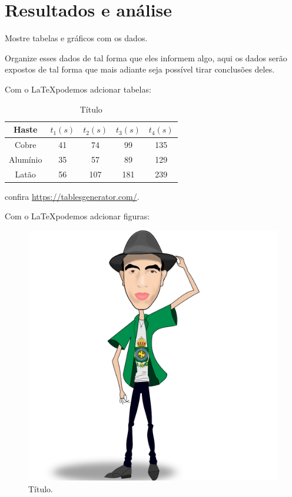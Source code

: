 \chapter{Resultados e análise}
  \vspace{0.5cm}

  Mostre tabelas e gráficos com os dados.

  Organize esses dados de tal forma que eles informem algo, aqui os dados serão expostos de tal forma que mais adiante seja possível tirar conclusões deles.

  Com o \LaTeX  podemos adcionar tabelas:

  \begin{table}[H]
     \centering
     \caption{\label{tab:part1}\footnotesize Título}
     \begin{tabular}{c|cccc}
        Haste    & $t_1(s)$ & $t_2(s)$ & $t_3(s)$ & $t_4(s)$ \\ \hline
        Cobre    & 41       & 74       & 99       & 135      \\
        Alumínio & 35       & 57       & 89       & 129      \\
        Latão    & 56       & 107      & 181      & 239     
     \end{tabular}
  \end{table}

  \noindent confira \url{https://tablesgenerator.com/}.

  Com o \LaTeX  podemos adcionar figuras:

  \begin{figure}[H]
     \centering
     \caption{\label{fig:coordenadas}\footnotesize Título.}
     \includegraphics[scale=0.2]{img_ismael}
  \end{figure}

